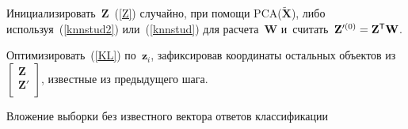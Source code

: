\begin{algorithm*} %
    \SetAlgoLined
    \setcounter{AlgoLine}{0}
    Инициализировать~$\mathbf{Z}$~(\ref{Z}) случайно, при помощи PCA($\tilde{\mathbf X}$), либо используя~(\ref{knnstud2}) или~(\ref{knnstud}) для расчета~$\mathbf W$ и~считать~$\mathbf{Z}'^{(0)} = \mathbf Z^{{\sf T}} \mathbf W$.
    
    {
        Оптимизировать~(\ref{KL}) по~$\mathbf z_{i}$, зафиксировав координаты остальных объектов из $\left [\begin{array}{c}
\mathbf Z \\
\hline
\mathbf Z' \\
\end{array}\right ]$, известные из предыдущего шага.
}
\caption{Вложение выборки без известного вектора ответов классификации} \label{batch}
\end{algorithm*}

\begin{figure*}[b] %
    \vspace*{4pt}
\begin{center}
\mbox{%
\epsfxsize=161.897mm
}
\end{center}
\vspace*{-9pt}
\label{dim_z_inform}
\end{figure*}

